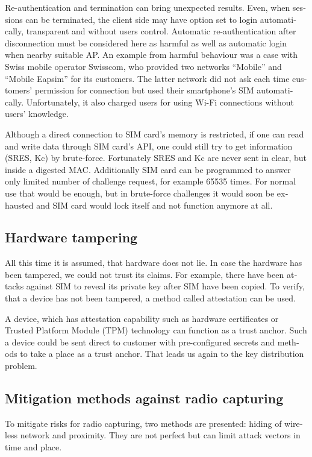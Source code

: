 \documentclass[12pt,a4paper,english]{tutthesis}
\begin{document}
\begin{otherlanguage}{english}
Re-authentication and termination can bring unexpected results.
Even, when sessions can be terminated, the client side may have 
option set to login automatically, transparent and without users control.
Automatic re-authentication after disconnection  must be considered
here as harmful as well as automatic login when nearby suitable AP. An
example from harmful behaviour was a case with  Swiss mobile operator Swisscom, who
 provided two networks ``Mobile'' and ``Mobile Eapsim''  for its
customers. 
The latter network did not ask each time customers' permission for
connection but used their smartphone's SIM
automatically. Unfortunately, it also charged users for using Wi-Fi
connections without users' knowledge.\cite{swisscom}



Although a direct connection to SIM card's memory is restricted,
if one can read and write data through SIM card's API,
one could still try to get information (SRES, Kc) by brute-force. 
Fortunately SRES and Kc are never sent in clear, but inside
a digested MAC.
 Additionally SIM card can be programmed to answer only
limited number of challenge request, for example 65535 times.
For normal use that would be enough, but in brute-force challenges 
it would soon be exhausted and SIM card would lock itself and not
function anymore at all.


\subsection{Hardware tampering}
\label{sec-6-1-6}
All this time it is assumed, that hardware does not lie. In case
the hardware has been tampered, we could not trust its claims.
For example, there have been attacks against SIM to reveal its private
key after SIM have been copied.  To verify, that a device has not been
tampered, a method called attestation can be used.

A device, which has attestation capability such as 
hardware certificates or Trusted Platform Module (TPM) technology
can function as a trust anchor.
Such a device could be sent direct to customer with pre-configured
secrets and methods to take a place as a trust anchor. 
That leads us again to the key distribution problem.


\subsection{Mitigation methods against radio capturing}
\label{sec-6-1-7}
To mitigate risks for radio capturing, two methods are presented: hiding of
wireless network and proximity. They are not perfect but can
limit attack vectors in time and place.



\end{otherlanguage}
\end{document}
